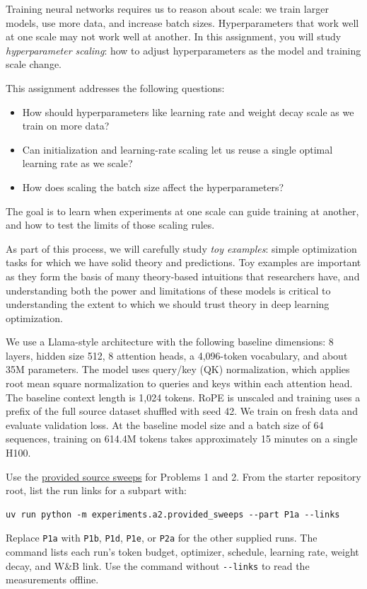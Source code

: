 
Training neural networks requires us to reason about scale: we train larger models, use more data, and
increase batch sizes. Hyperparameters that work well at one scale may not work well
at another. In this assignment, you will study \emph{hyperparameter scaling}: how
to adjust hyperparameters as the model and training scale change.

This assignment addresses the following questions:
\begin{itemize}
\item How should hyperparameters like learning rate and weight decay scale as we train on more data?
\item Can initialization and learning-rate scaling let us reuse a single optimal learning rate as we scale?
\item How does scaling the batch size affect the hyperparameters?
\end{itemize}
The goal is to learn when experiments at one scale can guide training at another,
and how to test the limits of those scaling rules.

As part of this process, we will carefully study \emph{toy examples}: simple optimization tasks for which we have solid theory and predictions. Toy examples are important as they form the basis of many theory-based intuitions that researchers have, and understanding both the power and limitations of these models is critical to understanding the extent to which we should trust theory in deep learning optimization.

\begin{shadebox}
We use a Llama-style architecture with the following baseline dimensions:
8 layers, hidden size 512, 8 attention heads, a 4,096-token vocabulary, and about
35M parameters. The model uses query/key (QK) normalization, which applies root mean square
normalization to queries and keys within each attention head. The baseline context
length is 1,024 tokens. RoPE is unscaled and training uses a prefix
of the full source dataset shuffled with seed 42. We train on fresh data and
evaluate validation loss.
At the baseline model size and a batch size of 64 sequences, training on 614.4M
tokens takes approximately 15 minutes on a single H100.
\end{shadebox}

Use the \href{\providedSweepsURL}{provided source sweeps} for Problems 1 and 2.
From the starter repository root, list the run links for a subpart with:
\begin{verbatim}
uv run python -m experiments.a2.provided_sweeps --part P1a --links
\end{verbatim}
Replace \texttt{P1a} with \texttt{P1b}, \texttt{P1d}, \texttt{P1e}, or \texttt{P2a} for the other supplied runs.
The command lists each run's token budget, optimizer, schedule, learning rate,
weight decay, and W\&B link.
Use the command without \texttt{-{}-links} to read the measurements offline.

